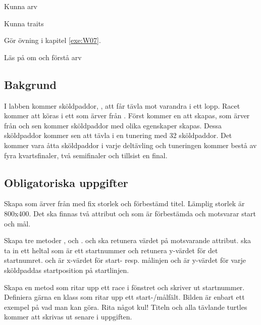 

\Lab{\LabWeekSEVEN}

\begin{Goals}
\item Kunna arv
\item Kunna traits
\end{Goals}

\begin{Preparations}
\item Gör övning {\tt \ExeWeekSEVEN} i kapitel \ref{exe:W07}.
\item Läs på om och förstå arv
\end{Preparations}

\subsection{Bakgrund}
I labben kommer sköldpaddor, , att får tävla mot varandra i ett lopp. Racet kommer att köras i ett  som ärver från . Först kommer en  att skapas, som ärver från  och sen kommer sköldpaddor med olika egenskaper skapas. Dessa sköldpaddor kommer sen att tävla i en tunering med 32 sköldpaddor. Det kommer vara åtta sköldpaddor i varje deltävling och tuneringen kommer bestå av fyra kvartsfinaler, två semifinaler och tillsist en final.

\subsection{Obligatoriska uppgifter}

\Task {}

\Subtask Skapa  som ärver från  med fix storlek och förbestämd titel. Lämplig storlek är 800x400. Det ska finnas två attribut  och  som är förbestämda och motsvarar start och mål.

\Subtask Skapa tre metoder ,  och .  och  ska retunera värdet på motsvarande attribut.  ska ta in ett heltal  som är ett startnummer och retunera y-värdet för det startnumret.  och  är x-värdet för start- resp. målinjen och  är y-värdet för varje sköldpaddas startposition på startlinjen.

\Subtask Skapa en metod  som ritar upp ett race i fönstret och skriver ut startnummer. Definiera gärna en klass som ritar upp ett start-/målfält. Bilden är enbart ett exempel på vad man kan göra. Rita något kul! Titeln och alla tävlande turtles kommer att skrivas ut senare i uppgiften.

